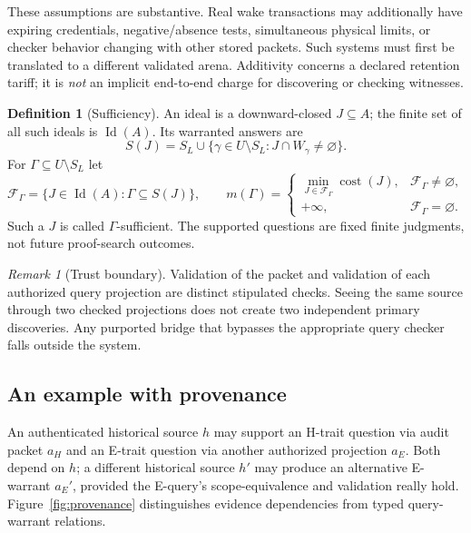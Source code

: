 \documentclass[10pt,letterpaper]{article}
\theoremstyle{definition}
\newtheorem{definition}[theorem]{Definition}
\theoremstyle{remark}
\newtheorem{remark}[theorem]{Remark}
\newcommand{\cost}{\operatorname{cost}}
\newcommand{\Id}{\operatorname{Id}}
\begin{document}
These assumptions are substantive. Real wake transactions may additionally have expiring credentials, negative/absence tests, simultaneous physical limits, or checker behavior changing with other stored packets. Such systems must first be translated to a different validated arena. Additivity concerns a declared retention tariff; it is \emph{not} an implicit end-to-end charge for discovering or checking witnesses.

\begin{definition}[Sufficiency]
An ideal is a downward-closed $J\subseteq A$; the finite set of all such ideals is $\Id(A)$. Its warranted answers are
\begin{equation}\label{eq:support}
S(J)=S_L\cup\{\gamma\in U\setminus S_L:J\cap W_\gamma\ne\varnothing\}.
\end{equation}
For $\Gamma\subseteq U\setminus S_L$ let
\begin{equation}\label{eq:feasible}
\mathcal F_\Gamma=\{J\in\Id(A):\Gamma\subseteq S(J)\},\qquad
m(\Gamma)=\begin{cases}\min_{J\in\mathcal F_\Gamma}\cost(J),&\mathcal F_\Gamma\ne\varnothing,\\+\infty,&\mathcal F_\Gamma=\varnothing.\end{cases}
\end{equation}
Such a $J$ is called $\Gamma$-sufficient. The supported questions are fixed finite judgments, not future proof-search outcomes.
\end{definition}

\begin{remark}[Trust boundary]
Validation of the packet and validation of each authorized query projection are distinct stipulated checks. Seeing the same source through two checked projections does not create two independent primary discoveries. Any purported bridge that bypasses the appropriate query checker falls outside the system.
\end{remark}

\subsection{An example with provenance}
An authenticated historical source $h$ may support an H-trait question via audit packet $a_H$ and an E-trait question via another authorized projection $a_E$. Both depend on $h$; a different historical source $h'$ may produce an alternative E-warrant $a_E'$, provided the E-query's scope-equivalence and validation really hold. Figure~\ref{fig:provenance} distinguishes evidence dependencies from typed query-warrant relations.
\end{document}
